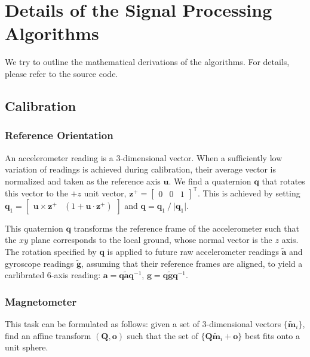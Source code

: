 \documentclass{nime-alternate} %
\begin{document}

 

\appendix
\section{Details of the Signal Processing Algorithms}
\label{appendix:signal-processing}
We try to outline the mathematical derivations of the algorithms. For details, please refer to the source code.

\subsection{Calibration}
\subsubsection{Reference Orientation}
\label{appendix:calib-ori}
An accelerometer reading is a 3-dimensional vector. When a sufficiently low variation of readings is achieved during calibration, their average vector is normalized and taken as the reference axis $\mathbf{u}$. We find a quaternion $\mathbf{q}$ that rotates this vector to the $+z$ unit vector, $\mathbf{z}^+ = \begin{bmatrix} 0 & 0 & 1 \end{bmatrix}^\mathsf{T}$. This is achieved by setting $\mathbf{q}_1 = \begin{bmatrix} \mathbf{u} \times \mathbf{z^+} & (1 + \mathbf{u} \cdot \mathbf{z^+}) \end{bmatrix}$ and $\mathbf{q} = \mathbf{q}_1 \mathbin{\mathop{/}} \lvert \mathbf{q}_1 \rvert$.

This quaternion $\mathbf{q}$ transforms the reference frame of the accelerometer such that the $xy$ plane corresponds to the local ground, whose normal vector is the $z$ axis. The rotation specified by $\mathbf{q}$ is applied to future raw accelerometer readings $\tilde{\mathbf{a}}$ and gyroscope readings $\tilde{\mathbf{g}}$, assuming that their reference frames are aligned, to yield a carlibrated 6-axis reading:
$\mathbf{a} = \mathbf{q} \tilde{\mathbf{a}} \mathbf{q}^{-1}$, $\mathbf{g} = \mathbf{q} \tilde{\mathbf{g}} \mathbf{q}^{-1}$.

\subsubsection{Magnetometer}
\label{appendix:calib-mag}
This task can be formulated as follows: given a set of 3-dimensional vectors $\{ \tilde{\mathbf{m}}_i \}$, find an affine transform $(\mathbf{Q}, \mathbf{o})$ such that the set of $\{\mathbf{Q} \tilde{\mathbf{m}}_i + \mathbf{o}\}$ best fits onto a unit sphere.
\end{document}
